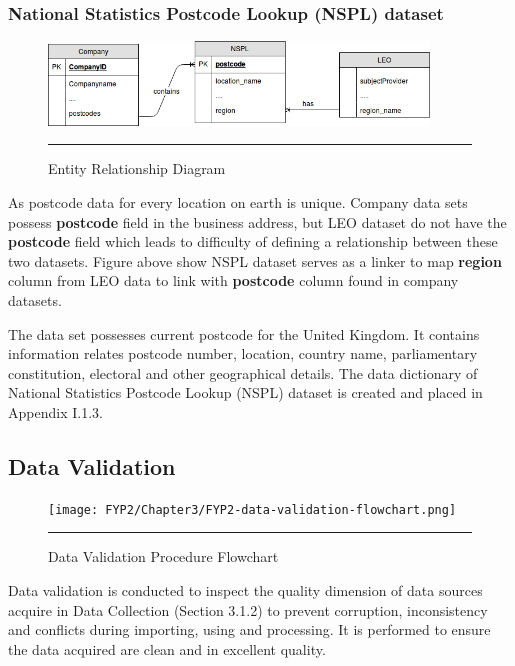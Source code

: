 \subsubsection{National Statistics Postcode Lookup (NSPL) dataset}

\begin{figure}[H]
	\centering
	\includegraphics[width=0.9\textwidth]{Figure/erd-data.png}
	\rule{35em}{0.5pt}
	\caption[Entity Relationship Diagram]{Entity Relationship Diagram}
\end{figure}

As postcode data for every location on earth is unique. Company data sets possess \textbf{postcode} field in the business address, but LEO dataset do not have the \textbf{postcode} field which leads to difficulty of defining a relationship between these two datasets. Figure above show NSPL dataset serves as a linker to map \textbf{region} column from LEO data to link with \textbf{postcode} column found in company datasets.

The data set possesses current postcode for the United Kingdom. It contains information relates postcode number, location, country name, parliamentary constitution, electoral and other geographical details. The data dictionary of National Statistics Postcode Lookup (NSPL) dataset is created and placed in Appendix I.1.3.



\subsection{Data Validation}

\begin{figure}[H]
	\centering
	\texttt{[image: FYP2/Chapter3/FYP2-data-validation-flowchart.png]}
	\rule{35em}{0.7pt}
	\caption[Data Validation Procedure Flowchart]{Data Validation Procedure Flowchart}
\end{figure}

Data validation is conducted to inspect the quality dimension of data sources acquire in Data Collection (Section 3.1.2) to prevent corruption, inconsistency and conflicts during importing, using and processing. It is performed to ensure the data acquired are clean and in excellent quality. 

